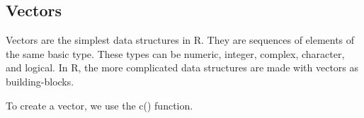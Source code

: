 \documentclass[
]{article}
\begin{document}
\hypertarget{vectors}{%
\subsection{Vectors}\label{vectors}}

Vectors are the simplest data structures in R. They are sequences of
elements of the same basic type. These types can be numeric, integer,
complex, character, and logical. In R, the more complicated data
structures are made with vectors as building-blocks.

To create a vector, we use the c() function.
\end{document}
